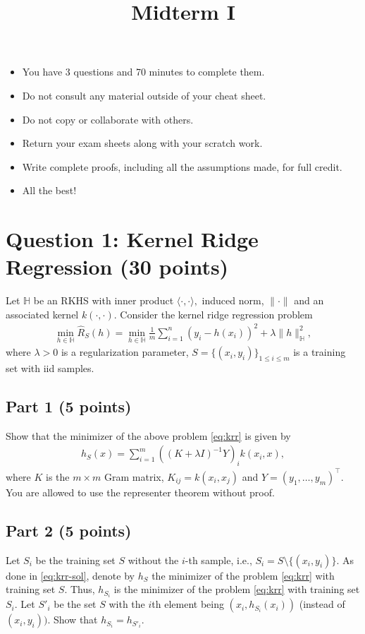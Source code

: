\documentclass[12pt]{article}
\title{Midterm I}
\begin{document}
\MakeScribeTop
\begin{itemize}
	\item You have 3 questions and 70 minutes to complete them.
	\item Do not consult any material outside of your cheat sheet.  	\item Do not copy or collaborate with others.
	\item Return your exam sheets along with your scratch work.
	\item Write complete proofs, including all the assumptions made, for full credit.
	\item All the best!
\end{itemize}

\section*{Question 1: Kernel Ridge Regression (30 points)}
Let $\mathbb{H}$ be an RKHS with inner product $\langle \cdot, \cdot\rangle,$ induced norm, $\|\cdot\|$ and an associated kernel $k(\cdot, \cdot)$. Consider the kernel ridge regression problem
\begin{align}
	\label{eq:krr}
	\min_{h \in \mathbb{H}} \hat{R}_S(h) = \min_{h\in \mathbb{H}} \frac{1}{m} \sum_{i=1}^n (y_i - h(x_i))^2 + \lambda \|h\|_{\mathbb{H}}^2, 
\end{align}
where $\lambda > 0$ is a regularization parameter, $S = \{(x_i,y_i)\}_{1\leq i\leq m}$ is a training set with iid samples.
\newpage
\subsection*{Part 1 (5 points)}

Show that the minimizer of the above problem \eqref{eq:krr} is given by
\begin{align}
	\label{eq:krr-sol}
	h_S(x) = \sum_{i=1}^m ((K + \lambda I)^{-1} Y)_i k(x_i, x),
\end{align}
where $K$ is the $m\times m$ Gram matrix, $K_{ij} = k(x_i, x_j)$ and $Y = (y_1, \ldots, y_m)^\top$.
You are allowed to use the representer theorem without proof.


\newpage
\subsection*{Part 2 (5 points)}
Let $S_i$ be the training set $S$ without the $i$-th sample, i.e., $S_i = S \setminus \{(x_i, y_i)\}$. As done in \eqref{eq:krr-sol}, denote by $h_{S}$ the minimizer of the problem \eqref{eq:krr} with training set $S$. Thus, $h_{S_i}$ is the minimizer of the problem \eqref{eq:krr} with training set $S_i.$ Let $S'_i$ be the set $S$ with the $i$th element being $(x_i, h_{S_i}(x_i))$ (instead of $(x_i, y_i))$. Show that $h_{S_i} = h_{S'_i}$.
\newpage
\end{document}

